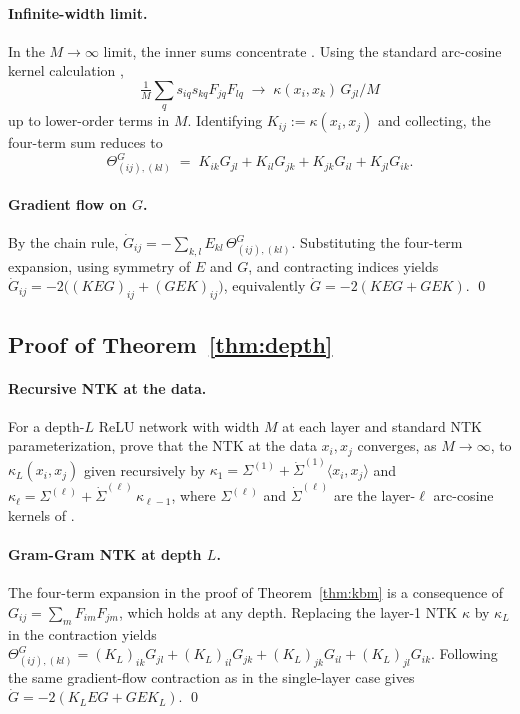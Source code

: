 \documentclass[11pt,letterpaper]{article}
\newcommand{\E}{E}
\begin{document}
\paragraph{Infinite-width limit.}
In the $M \to \infty$ limit, the inner sums concentrate
\citep{jacot2018neural}. Using the standard arc-cosine kernel calculation
\citep{cho2009kernel,jacot2018neural},
\[
\tfrac{1}{M}\textstyle\sum_q s_{iq}s_{kq}F_{jq}F_{lq}
\;\to\; \kappa(x_i, x_k)\,G_{jl}/M
\]
up to lower-order terms in $M$. Identifying $K_{ij} := \kappa(x_i, x_j)$ and
collecting, the four-term sum reduces to
\[
\Theta^G_{(ij),(kl)} \;=\; K_{ik}G_{jl} + K_{il}G_{jk} + K_{jk}G_{il} + K_{jl}G_{ik}.
\]

\paragraph{Gradient flow on $G$.}
By the chain rule,
$\dot G_{ij} = -\sum_{k,l}\E_{kl}\,\Theta^G_{(ij),(kl)}$. Substituting
the four-term expansion, using symmetry of $\E$ and $G$, and contracting
indices yields
$\dot G_{ij} = -2\bigl((K\E G)_{ij} + (G\E K)_{ij}\bigr)$, equivalently
$\dot G = -2(K\E G + G\E K)$. \qed

\subsection{Proof of Theorem~\ref{thm:depth}}

\paragraph{Recursive NTK at the data.}
For a depth-$L$ ReLU network with width $M$ at each layer and standard NTK
parameterization, \citet{jacot2018neural} prove that the NTK at the data
$x_i, x_j$ converges, as $M \to \infty$, to $\kappa_L(x_i, x_j)$ given
recursively by $\kappa_1 = \Sigma^{(1)} + \dot\Sigma^{(1)}\langle x_i, x_j\rangle$
and $\kappa_\ell = \Sigma^{(\ell)} + \dot\Sigma^{(\ell)}\,\kappa_{\ell-1}$,
where $\Sigma^{(\ell)}$ and $\dot\Sigma^{(\ell)}$ are the layer-$\ell$
arc-cosine kernels of \citet{cho2009kernel}.

\paragraph{Gram-Gram NTK at depth $L$.}
The four-term expansion in the proof of Theorem~\ref{thm:kbm} is a
consequence of $G_{ij} = \sum_m F_{im}F_{jm}$, which holds at any depth.
Replacing the layer-1 NTK $\kappa$ by $\kappa_L$ in the contraction yields
$\Theta^G_{(ij),(kl)} = (K_L)_{ik}G_{jl} + (K_L)_{il}G_{jk}
+ (K_L)_{jk}G_{il} + (K_L)_{jl}G_{ik}$.
Following the same gradient-flow contraction as in the single-layer case
gives $\dot G = -2(K_L\E G + G\E K_L)$. \qed
\end{document}
